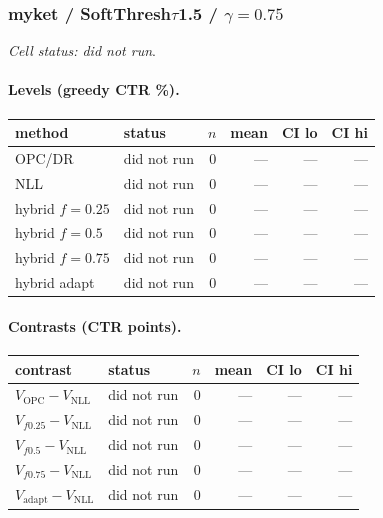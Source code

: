 \documentclass[10pt,a4paper]{article}
\begin{document}
\subsubsection{myket / SoftThresh$\tau$1.5 / $\gamma=0.75$}
\emph{Cell status: did not run}.
\paragraph{Levels (greedy CTR \%).}
{\centering\small\begin{tabular}{llrrrr}
\toprule method & status & $n$ & mean & CI lo & CI hi \\
\midrule
OPC/DR & did not run & 0 & --- & --- & --- \\
NLL & did not run & 0 & --- & --- & --- \\
hybrid $f{=}0.25$ & did not run & 0 & --- & --- & --- \\
hybrid $f{=}0.5$ & did not run & 0 & --- & --- & --- \\
hybrid $f{=}0.75$ & did not run & 0 & --- & --- & --- \\
hybrid adapt & did not run & 0 & --- & --- & --- \\
\bottomrule\end{tabular}\par}
\paragraph{Contrasts (CTR points).}
{\centering\small\begin{tabular}{llrrrr}
\toprule contrast & status & $n$ & mean & CI lo & CI hi \\
\midrule
$V_{\mathrm{OPC}}-V_{\mathrm{NLL}}$ & did not run & 0 & --- & --- & --- \\
$V_{f0.25}-V_{\mathrm{NLL}}$ & did not run & 0 & --- & --- & --- \\
$V_{f0.5}-V_{\mathrm{NLL}}$ & did not run & 0 & --- & --- & --- \\
$V_{f0.75}-V_{\mathrm{NLL}}$ & did not run & 0 & --- & --- & --- \\
$V_{\mathrm{adapt}}-V_{\mathrm{NLL}}$ & did not run & 0 & --- & --- & --- \\
\bottomrule\end{tabular}\par}
\end{document}
